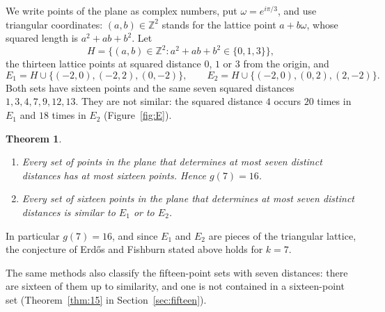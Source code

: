 \documentclass[11pt]{amsart}
\newtheorem{theorem}{Theorem}
\theoremstyle{definition}
\theoremstyle{remark}
\newcommand{\Z}{\mathbb{Z}}
\begin{document}
We write points of the plane as complex numbers, put $\omega=e^{i\pi/3}$, and use triangular coordinates:
$(a,b)\in\Z^2$ stands for the lattice point $a+b\omega$, whose squared length is $a^2+ab+b^2$. Let
\[
  H=\{(a,b)\in\Z^2 : a^2+ab+b^2\in\{0,1,3\}\},
\]
the thirteen lattice points at squared distance $0$, $1$ or $3$ from the origin, and
\[
  E_1=H\cup\{(-2,0),(-2,2),(0,-2)\},\qquad E_2=H\cup\{(-2,0),(0,2),(2,-2)\}.
\]
Both sets have sixteen points and the same seven squared distances $1,3,4,7,9,12,13$. They are not
similar: the squared distance $4$ occurs $20$ times in $E_1$ and $18$ times in $E_2$
(Figure~\ref{fig:E}).

\begin{theorem}\label{thm:main}
\leavevmode
\begin{enumerate}
\item Every set of points in the plane that determines at most seven distinct distances has at most
  sixteen points. Hence $g(7)=16$.
\item Every set of sixteen points in the plane that determines at most seven distinct distances is
  similar to $E_1$ or to $E_2$.
\end{enumerate}
\end{theorem}

In particular $g(7)=16$, and since $E_1$ and $E_2$ are pieces of the triangular lattice, the conjecture of
Erdős and Fishburn stated above holds for $k=7$.

The same methods also classify the fifteen-point sets with seven distances: there are sixteen of them up to
similarity, and one is not contained in a sixteen-point set (Theorem~\ref{thm:15} in
Section~\ref{sec:fifteen}).
\end{document}
